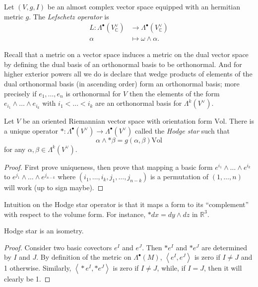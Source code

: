 \begin{definition}
\label{definition-lefschetz-operator}
Let $(V,g,I)$ be an almost complex vector
space
equipped with an hermitian metric $g$.
The {\it Lefschetz operator} is
$$
\begin{aligned}
L: \Lambda^\bullet(V_{\mathbb{C}}^\vee)
&\longrightarrow
\Lambda^\bullet(V_{\mathbb{C}}^\vee) \\
\alpha &\longmapsto \omega\wedge\alpha.
\end{aligned}
$$
\end{definition}

\noindent
Recall that a metric on a vector space
induces a metric on the dual vector space
by defining the dual basis of an orthonormal
basis
to be orthonormal.
And for higher exterior powers all we do is
declare that wedge products of elements of
the dual orthonormal basis
(in ascending order)
form an orthonormal basis; more precisely
if $e_1,…,e_n$ is orthonormal for $V$ then
the elements of the form
$e_{i_1}\wedge…\wedge e_{i_k}$ with
$i_1<…<i_k$
are an orthonormal basis for
$\Lambda^k(V^\vee)$.


\begin{exercise}
\label{exercise-hodge-star-existence}
Let $V$ be an oriented Riemannian vector
space with
orientation form $\text{Vol}$.
There is a unique operator
$*:\Lambda^\bullet(V^\vee) \to
\Lambda^\bullet(V^\vee)$
called the {\it Hodge star} such that
$$
\alpha\wedge*\beta=g(\alpha,\beta)\text{Vol}
$$
for any $\alpha,\beta \in \Lambda^k(V^\vee)$.
\end{exercise}

\begin{proof}
First prove uniqueness,
then prove that mapping a basic form
$e^{i_1}\wedge… \wedge e^{i_k}$
to $e^{j_1}\wedge…\wedge e^{j_{n-k}}$
where $(i_1,…,i_k,j_1,…,j_{n-k})$ is a
permutation of
$(1,…,n)$ will work (up to sign maybe).
\end{proof}

\noindent
Intuition on the Hodge star operator is that
it maps a form to its ``complement'' with
respect to the volume form.
For instance, $*dx=dy \wedge dz$ in
$\mathbb{R}^3$.

\begin{lemma}
\label{lemma-hodge-star-isometry}
Hodge star is an isometry.
\end{lemma}

\begin{proof}
Consider two basic covectors $e^I$ and $e^J$.
Then $*e^I$ and $*e^J$ are determined by $I$
and $J$.
By definition of the metric on
$\Lambda^\bullet(M)$,
$\left\langle{}e^I,e^J\right\rangle{}$ is zero if $I\neq J$
and 1 otherwise.
Similarly, $\left\langle{}*e^I,*e^J\right\rangle{}$ is zero
if $I\neq J$,
while, if $I=J$, then it will clearly be 1.
\end{proof}

